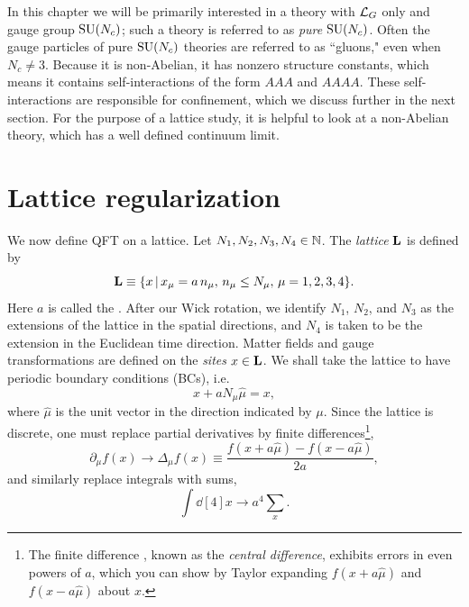 In this chapter we will be primarily interested in a theory with 
$\mathcal{L}_G$ only and gauge group $\operatorname{SU}(N_c)$; such a theory is referred
to as {\it pure} $\operatorname{SU}(N_c)$.
Often the gauge particles of pure $\operatorname{SU}(N_c)$ theories are referred
to as ``gluons," even when $N_c\neq 3$. Because it
is non-Abelian, it has nonzero structure constants, which means it
contains self-interactions of the form $AAA$ and $AAAA$. 
These self-interactions are responsible for confinement, which we discuss
further in the next section. 
For the purpose of a lattice study,
it is helpful to look at a non-Abelian theory, which
has a well defined continuum limit.

\section{Lattice regularization}\label{sec:latreg}
We now define QFT on a lattice. Let $N_{1},N_{2},N_{3},N_{4}
\in \mathbb{N}$. The {\it lattice} ${\mathbf L}$ is defined by
\begin{equation}
  {\mathbf L}\equiv\{x\,|\,x_\mu=a\,n_\mu,\,n_\mu\le N_\mu,\,
      \mu=1,2,3,4\}.
\end{equation}
Here $a$ is called the . 
After our Wick rotation, we identify $N_1$, $N_2$, and $N_3$
as the extensions of the lattice in the spatial directions,
and $N_4$ is taken to be the extension in the Euclidean time 
direction. Matter fields and gauge 
transformations are defined on the  {\it sites} $x\in\mathbf L$. We shall 
take the lattice to have periodic boundary conditions (BCs), i.e.
\begin{equation}\label{eq:PBC}
  x+aN_{\mu}\hat{\mu}=x,
\end{equation}
where $\hat{\mu}$ is the unit vector in the direction indicated by $\mu$. 
Since the lattice is discrete, one must replace partial derivatives 
by finite differences\footnote{The finite difference ,
known as the {\it central difference},
exhibits errors in even powers of $a$, which you can show by Taylor
expanding $f(x+a\hat{\mu})$ and $f(x-a\hat{\mu})$ about $x$.}, 
\begin{equation}\label{eq:dertodiff}
  \partial_\mu f(x)\to\Delta_{\mu}f(x)\equiv\frac{f(x+a\hat{\mu})
                                                   -f(x-a\hat{\mu})}{2a},
\end{equation}
and similarly replace integrals with sums,
\begin{equation}\label{eq:inttosum}
  \int \dd[4]{x}\to a^4\sum_x.
\end{equation}
